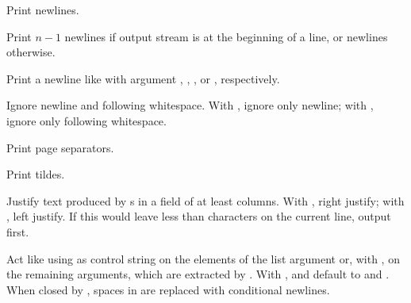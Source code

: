 \begin{LIST}{1cm}
\begin{LIST}{.5cm}
    {%
      Print  newlines.
    }

    {%
      Print $n-1$ newlines if output stream is at the
      beginning of a line, or  newlines otherwise.
    }

    {%
      Print a newline like  with argument
      , , , or , respectively.
    }

    {
       Ignore newline and following
      whitespace. With \kwd{:}, ignore only newline; with ,
      ignore only following whitespace.
    }

    {%
      Print  page separators.
    }

    {%
      Print  tildes.
    }

    {%
      Justify text produced by s in a field of at least
       columns. With \kwd{:}, right justify; with ,
      left justify. If this would leave less than  characters
      on the current line, output  first.
    }

    {%
      Act like  using  as 
      control string on the elements of the list argument or, with ,
      on the remaining arguments, which are extracted by
      . With \KWD{:},  and 
      default to \LIT{(} and \LIT{)}. When closed by
      , spaces in  are replaced with
      conditional newlines. 
    }


\end{LIST}
\end{LIST}
